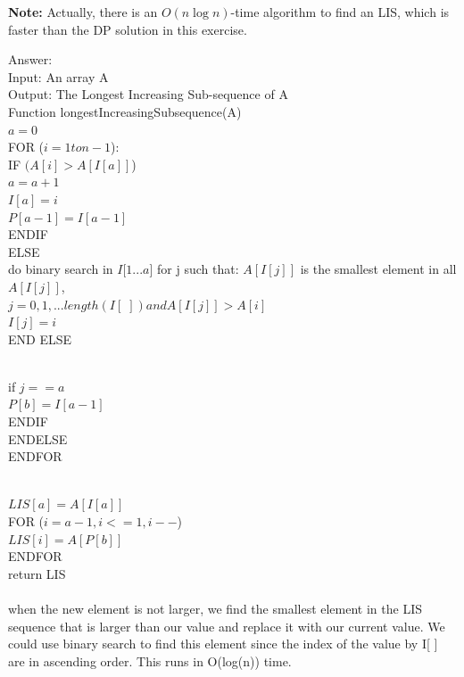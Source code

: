 \documentclass[12pt]{article}
\begin{document}
\begin{enumerate}
\begin{enumerate}
\textbf{Note:} Actually, there is an $O(n\log n)$-time algorithm to find an LIS, which is faster than the DP solution in this exercise.
\\{\color{blue}Answer:
\\Input: An array A 
\\Output: The Longest Increasing Sub-sequence of A
\\Function longestIncreasingSubsequence(A)
\\$a = 0$
\\FOR ($i = 1 to n - 1$):      
\\IF $(A[i] > A[I[a]]$)     
\\$ a = a+1 $           
  \\      $ I[a] = i $      
    \\     $P[a-1] = I[a-1]$ 
    \\ENDIF
      \\ELSE
        \\ do binary search in $I[1...a$] for j such that: $A[I[j]]$ is the smallest element in all $A[I[j]]$, 
        \\$j=0,1,...length(I[\;]) and A[I[j]] > A[i] $ 
         \\$I[j] = i $     
         \\END ELSE
         
         
        \\if $j == a $        
          \\  $P[b] = I[a-1]$ 
          \\ENDIF
          \\ENDELSE
          \\ENDFOR
   
 
  \\$ LIS[a] = A[I[a]]$       
  \\FOR ($i = a - 1, i<=1, i--$)  
  \\    $LIS[i] = A[P[b]]$
  \\ENDFOR
  \\ return LIS
  \\
  \\when the new element is not larger, we find the smallest element in the LIS sequence that is larger than our value and replace it with our current value. We could use binary search to find this element since the index of the value by I[ ] are in ascending order. This runs in O(log(n)) time.
  
  }

\end{enumerate}

\end{enumerate}
\end{document}
